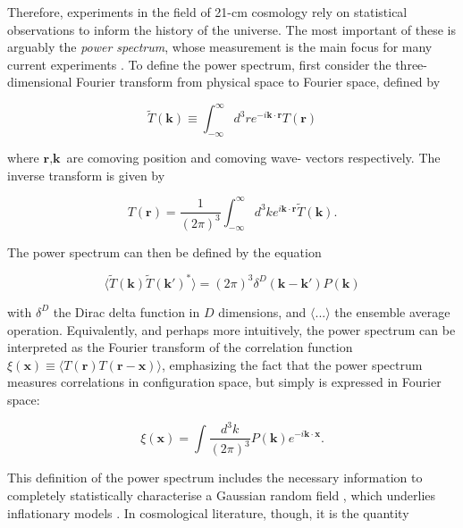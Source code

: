 \documentclass[floats,floatfix,showpacs,amssymb,prd,superscriptaddress,nofootinbib]{revtex4-2} %
\begin{document}
Therefore, experiments in the field of 21-cm cosmology rely on statistical observations to inform the history of the universe. The most important of these is arguably the \textit{power spectrum}, whose measurement is the main focus for many current experiments \citep{DeBoer_2017}. To define the power spectrum, first consider the three-dimensional Fourier transform from physical space to Fourier space, defined by

\begin{equation}
    \tilde{T} (\textbf{k}) \equiv \int^\infty _{-\infty} d^3 r e^{-i\textbf{k} \cdot \textbf{r}} T(\textbf{r})
\end{equation}

\noindent where $\textbf{r}, \textbf{k}$ are comoving position and comoving wave- vectors respectively. The inverse transform is given by 

\begin{equation}
    T(\textbf{r}) = \frac{1}{(2 \pi)^3} \int^\infty _{-\infty} d^3 k e^{i \textbf{k} \cdot \textbf{r}} \tilde{T}(\textbf{k}).
\end{equation}

The power spectrum can then be defined by the equation

\begin{equation}
    \langle \tilde{T} (\textbf{k}) \tilde{T} (\textbf{k}') ^{*} \rangle = (2 \pi)^3 \delta^{D}  (\textbf{k} - \textbf{k}') P(\textbf{k})
\end{equation}

\noindent with $\delta^D$ the Dirac delta function in $D$ dimensions, and $\langle ... \rangle$ the ensemble average operation. Equivalently, and perhaps more intuitively, the power spectrum can be interpreted as the Fourier transform of the correlation function $\xi(\textbf{x}) \equiv \langle T(\textbf{r}) T(\textbf{r} - \textbf{x}) \rangle$, emphasizing the fact that the power spectrum measures correlations in configuration space, but simply is expressed in Fourier space:

\begin{equation}
    \xi(\textbf{x}) = \int \frac{d^3 k}{(2 \pi)^3} P(\textbf{k}) e^{-i \textbf{k} \cdot \textbf{x}}.
\end{equation}

This definition of the power spectrum includes the necessary information to completely statistically characterise a Gaussian random field \citep{Coles_2001}, which underlies inflationary models \citep{Guth_Pi_1982, Brandenberger_1985}. In cosmological literature, though, it is the quantity 
\end{document}
